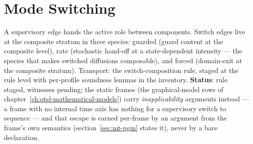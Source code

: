 

\section{Mode Switching}
\label{sec:cp-switch}

A supervisory edge hands the active role between components. Switch
edges live at the composite stratum in three species: guarded (guard
content at the composite level), rate (stochastic hand-off at a
state-dependent intensity --- the species that makes switched
diffusions composable), and forced (domain-exit at the composite
stratum). Transport: the switch-composition rule, staged at the rule
level with per-profile soundness lemmas in the inventory.
\textbf{Status}: rule staged, witnesses pending; the static frames
(the graphical-model rows of chapter~\ref{ch:qtsl-mathematical-models}) carry
\emph{inapplicability} arguments instead --- a frame with no
internal time axis has nothing for a supervisory switch to sequence
--- and that escape is earned per-frame by an argument from the
frame's own semantics (section~\ref{sec:mt-pgm} states it), never by
a bare declaration.



